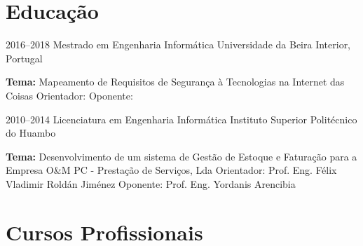 \section{Educação}

\begin{entrada}

\lista
{2016--2018}
{Mestrado {\normalfont em Engenharia Informática }}
{Universidade da Beira Interior, Portugal}
{\vspace{-0.3cm}}

\dissert
{}
{\textbf{Tema:} Mapeamento de Requisitos de Segurança à Tecnologias na Internet das Coisas}
{Orientador: {\normalfont {}}}
{Oponente: {\normalfont {}}}
{\vspace{-0.3cm}}



\lista
{2010--2014}
{Licenciatura {\normalfont em Engenharia Informática }}
{Instituto Superior Politécnico do Huambo}
{\vspace{-0.3cm}}

\dissert
{}
{\textbf{Tema:} Desenvolvimento de um sistema de Gestão de Estoque e Faturação para a Empresa O\&M PC - Prestação de Serviços, Lda}
{Orientador: {\normalfont Prof. Eng. Félix Vladimir Roldán Jiménez}}
{Oponente: {\normalfont Prof. Eng. Yordanis Arencibia}}
{\vspace{-0.3cm}}

\end{entrada}

\vspace{-1.3cm}
\newpage
\section{Cursos Profissionais}

